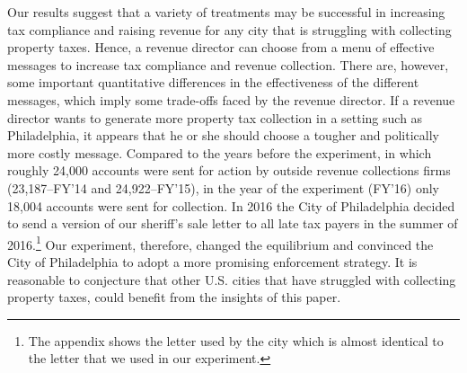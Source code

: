 \documentclass[12pt]{article}
\begin{document}
Our results suggest that a variety of treatments may be successful in
increasing tax compliance and raising revenue for any city that is
struggling with collecting property taxes. Hence, a revenue director
can choose from a menu of effective messages to increase tax
compliance and revenue collection. There are, however, some important
quantitative differences in the effectiveness of the different
messages, which imply some trade-offs faced by the revenue director.
If a revenue director wants to generate more property tax collection
in a setting such as Philadelphia, it appears that he or she should
choose a tougher and politically more costly message.  Compared to the
years before the experiment, in which roughly 24,000 accounts were
sent for action by outside revenue collections firms (23,187--FY'14
and 24,922--FY'15), in the year of the experiment (FY'16) only 18,004
accounts were sent for collection. In 2016 the City of Philadelphia
decided to send a version of our sheriff's sale letter to all late tax
payers in the summer of 2016.\footnote{The appendix shows the letter
  used by the city which is almost identical to the letter that we
  used in our experiment.} Our experiment, therefore, changed the
equilibrium and convinced the City of Philadelphia to adopt a more
promising enforcement strategy.  It is reasonable to conjecture that
other U.S. cities that have struggled with collecting property taxes,
could benefit from the insights of this paper.

\newpage





\bigskip

\bigskip

\bigskip

\newpage
\end{document}
